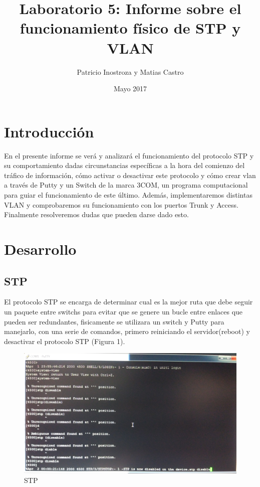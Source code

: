 \documentclass{article}
\title{Laboratorio 5: Informe sobre el funcionamiento físico de STP y VLAN}
\author{Patricio Inostroza y Matias Castro }
\date{Mayo 2017}
\begin{document}
\begin{titlepage}

\maketitle
\huge


\end{titlepage}

\tableofcontents 
\cleardoublepage

\section{Introducción}
En el presente informe se verá y analizará el funcionamiento del protocolo STP y su comportamiento dadas circunstancias específicas a la hora del comienzo del tráfico de información, cómo activar o desactivar este protocolo y cómo crear vlan a través de Putty y un Switch de la marca 3COM, un programa computacional para guiar el funcionamiento de este último. Además, implementaremos distintas VLAN y comprobaremos su funcionamiento con los puertos Trunk y Access. Finalmente resolveremos dudas que pueden darse dado esto.

\newpage

\section{Desarrollo}
\subsection{STP}
El protocolo STP se encarga de determinar cual es la mejor ruta que debe seguir un paquete entre switchs para evitar que se genere un bucle entre enlaces que pueden ser redundantes, fisicamente se utilizara un switch y Putty para manejarlo, con una serie de comandos, primero reiniciando el servidor(reboot) y desactivar el protocolo STP (Figura 1).

\begin{figure}[h!]
\centering
\includegraphics[scale=0.08]{IMG1}
\caption{STP}
\end{figure}
\end{document}
